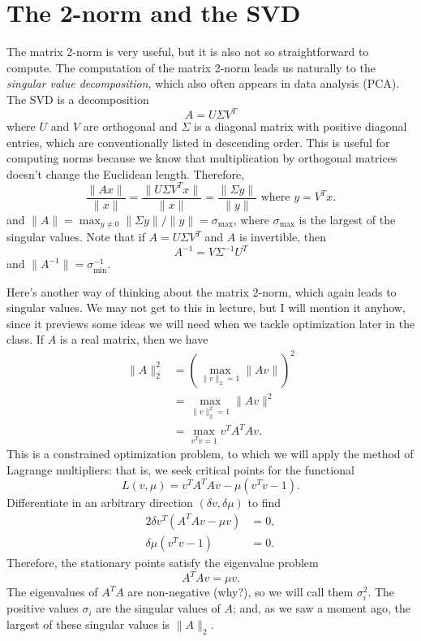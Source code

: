 \documentclass[12pt, leqno]{article}
\begin{document}
\section*{The 2-norm and the SVD}

The matrix 2-norm is very useful, but it is also not so straightforward
to compute.  The computation of the matrix 2-norm leads us naturally
to the {\em singular value decomposition}, which also often appears in
data analysis (PCA).  The SVD is a decomposition
\[
  A = U \Sigma V^T
\]
where $U$ and $V$ are orthogonal and $\Sigma$ is a diagonal matrix
with positive diagonal entries, which are conventionally listed in
descending order.  This is useful for computing norms
because we know that multiplication by orthogonal matrices doesn't
change the Euclidean length.  Therefore,
\[
\frac{\|Ax\|}{\|x\|} =
\frac{\|U \Sigma V^T x\|}{\|x\|} =
\frac{\|\Sigma y\|}{\|y\|} \mbox{ where } y = V^T x.
\]
and $\|A\| = \max_{y \neq 0} \|\Sigma y\|/\|y\| = \sigma_{\max}$,
where $\sigma_{\max}$ is the largest of the singular values.
Note that if $A = U \Sigma V^T$ and $A$ is invertible, then
\[
  A^{-1} = V \Sigma^{-1} U^T
\]
and $\|A^{-1}\| = \sigma_{\min}^{-1}$.

Here's another way of thinking about the matrix 2-norm, which again
leads to singular values.  We may not get to this in lecture,
but I will mention it anyhow, since it previews some ideas we will
need when we tackle optimization later in the class.
If $A$ is a real matrix, then we have
\begin{align*}
  \|A\|_2^2 
    &= \left( \max_{\|v\|_2 = 1} \|Av\| \right)^2 \\
    &= \max_{\|v\|_2^2 = 1} \|Av\|^2 \\
    &= \max_{v^T v = 1} v^T A^T A v.
\end{align*}
This is a constrained optimization problem, to which we will apply the
method of Lagrange multipliers: that is, we seek critical points for
the functional
\[
  L(v, \mu) = v^T A^T A v - \mu (v^T v-1).
\]
Differentiate in an arbitrary direction $(\delta v, \delta \mu)$ to find
\begin{align*}
  2 \delta v^T (A^T A v - \mu v) & = 0, \\
  \delta \mu (v^T v-1) & = 0.
\end{align*} 
Therefore, the stationary points satisfy the eigenvalue problem
\[
  A^T A v = \mu v.
\]
The eigenvalues of $A^T A$ are non-negative (why?), so we will call
them $\sigma_i^2$.  The positive values $\sigma_i$ are the singular
values of $A$; and, as we saw a moment ago, the largest of these
singular values is $\|A\|_2$.
\end{document}
